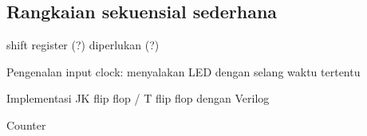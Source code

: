 \subsection{Rangkaian sekuensial sederhana}

shift register (?) diperlukan (?)

Pengenalan input clock:
menyalakan LED dengan selang waktu tertentu

Implementasi JK flip flop / T flip flop dengan Verilog

Counter


